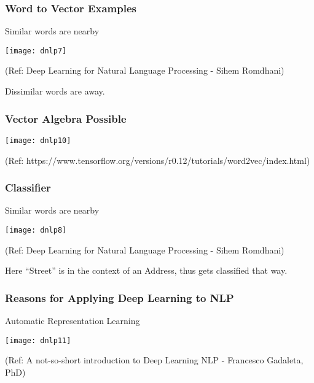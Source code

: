 \begin{frame}[fragile]\frametitle{Word to Vector Examples}
Similar words are nearby

\begin{center}
\texttt{[image: dnlp7]}

\tiny{(Ref:  Deep Learning for Natural Language Processing - Sihem Romdhani)}
\end{center}

Dissimilar words are away.
\end{frame}


\begin{frame}[fragile]\frametitle{Vector Algebra Possible}

\begin{center}
\texttt{[image: dnlp10]}

\tiny{(Ref:   https://www.tensorflow.org/versions/r0.12/tutorials/word2vec/index.html)}
\end{center}

\end{frame}


\begin{frame}[fragile]\frametitle{Classifier}
Similar words are nearby

\begin{center}
\texttt{[image: dnlp8]}

\tiny{(Ref:  Deep Learning for Natural Language Processing - Sihem Romdhani)}
\end{center}

Here ``Street''  is in the context of an Address, thus gets classified that way.
\end{frame}

\begin{frame}[fragile]\frametitle{Reasons for Applying Deep Learning to NLP}
Automatic Representation Learning

\begin{center}
\texttt{[image: dnlp11]}

\tiny{(Ref:  A not-so-short introduction to Deep Learning NLP - Francesco Gadaleta, PhD)}
\end{center}

\end{frame}

